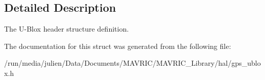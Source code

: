 \subsection{Detailed Description}
The U-\/\+Blox header structure definition. 

The documentation for this struct was generated from the following file\+:\begin{DoxyCompactItemize}
\item 
/run/media/julien/\+Data/\+Documents/\+M\+A\+V\+R\+I\+C/\+M\+A\+V\+R\+I\+C\+\_\+\+Library/hal/gps\+\_\+ublox.\+h\end{DoxyCompactItemize}
